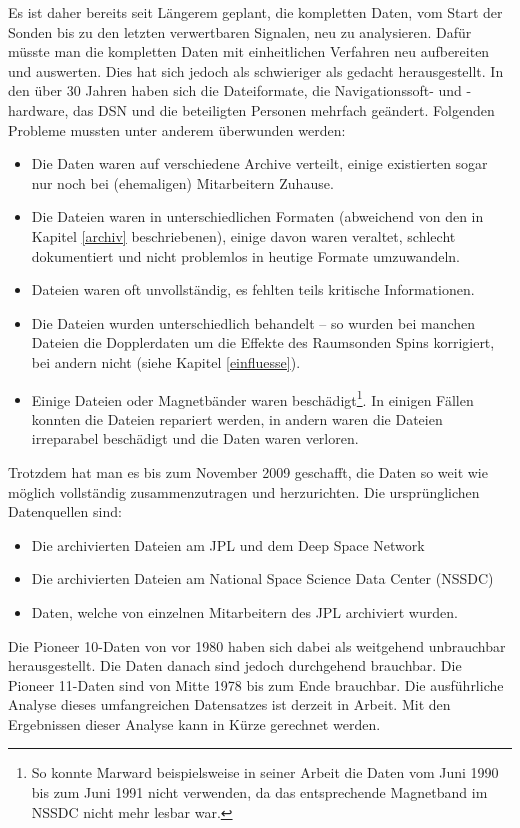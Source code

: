 Es ist daher bereits seit Längerem geplant, die kompletten Daten, vom Start der Sonden bis zu den letzten verwertbaren Signalen, neu zu analysieren. Dafür müsste man die kompletten Daten mit einheitlichen Verfahren neu aufbereiten und auswerten. Dies hat sich jedoch als schwieriger als gedacht herausgestellt. In den über 30 Jahren haben sich die Dateiformate, die Navigationssoft- und -hardware, das DSN und die beteiligten Personen mehrfach geändert. Folgenden Probleme mussten unter anderem überwunden werden\cite{Turyshev2010}:
\begin{itemize}
\item Die Daten waren auf verschiedene Archive verteilt, einige existierten sogar nur noch bei (ehemaligen) Mitarbeitern Zuhause.
\item Die Dateien waren in unterschiedlichen Formaten (abweichend von den in Kapitel \ref{archiv} beschriebenen), einige davon waren veraltet, schlecht dokumentiert und nicht problemlos in heutige Formate umzuwandeln.
\item Dateien waren oft unvollständig, es fehlten teils kritische Informationen.
\item Die Dateien wurden unterschiedlich behandelt – so wurden bei manchen Dateien die Dopplerdaten um die Effekte des Raumsonden Spins korrigiert, bei andern nicht (siehe Kapitel \ref{einfluesse}).
\item Einige Dateien oder Magnetbänder waren beschädigt\footnote{So konnte Marward beispielsweise in seiner Arbeit die Daten vom Juni 1990 bis zum Juni 1991 nicht verwenden, da das entsprechende Magnetband im NSSDC nicht mehr lesbar war\cite{Markwardt2002}.}. In einigen Fällen konnten die Dateien repariert werden, in andern waren die Dateien irreparabel beschädigt und die Daten waren verloren.
\end{itemize}
Trotzdem hat man es bis zum November 2009 geschafft, die Daten so weit wie möglich vollständig zusammenzutragen und herzurichten.
Die ursprünglichen Datenquellen sind: %
\begin{itemize}
\item Die archivierten Dateien am JPL und dem Deep Space Network
\item Die archivierten Dateien am National Space Science Data Center (NSSDC)
\item Daten, welche von einzelnen Mitarbeitern des JPL archiviert wurden.
\end{itemize}
Die Pioneer 10-Daten von vor 1980 haben sich dabei als weitgehend unbrauchbar herausgestellt. Die Daten danach sind jedoch durchgehend brauchbar. Die Pioneer 11-Daten sind von Mitte 1978 bis zum Ende brauchbar. Die ausführliche Analyse dieses umfangreichen Datensatzes ist derzeit in Arbeit\cite{Turyshev2010}. Mit den Ergebnissen dieser Analyse kann in Kürze gerechnet werden. %

